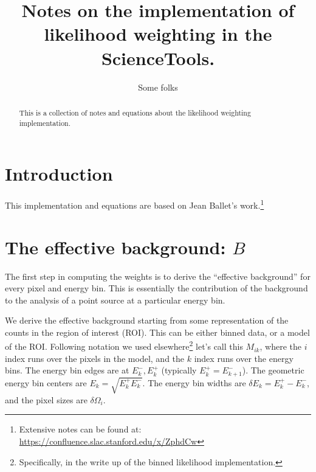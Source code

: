\documentclass[preprint]{aastex}
\begin{document}
%
\title{Notes on the implementation of likelihood weighting in the ScienceTools.}  

\author{ 
Some folks
}



\begin{abstract}
  This is a collection of notes and equations about the likelihood weighting implementation.
\end{abstract}

\maketitle

\section{Introduction}

This implementation and equations are based on Jean Ballet's work.\footnote{Extensive notes can be found at: \url{https://confluence.slac.stanford.edu/x/ZphdCw}}


\section{The effective background: $B$}

The first step in computing the weights is to derive the ``effective
background'' for every pixel and energy bin.  This is essentially the
contribution of the background to the analysis of a point source at a
particular energy bin.

We derive the effective background starting from some representation
of the counts in the region of interest (ROI).  This can be either
binned data, or a model of the ROI.  Following notation we used
elsewhere\footnote{Specifically, in the write up of the binned
  likelihood implementation.} let's call this $M_{ik}$, where the $i$
index runs over the pixels in the model, and the $k$ index runs over
the energy bins.  The energy bin edges are at $E_k^-, E_k^+$
(typically $E_k^+ = E_{k+1}^-$).  The geometric energy bin centers are
$E_k = \sqrt{E_k^+ E_k^-}$.  The energy bin widths are $\delta E_k = E_k^+
- E_k^-$, and the pixel sizes are $\delta \Omega_i$.
\end{document}
